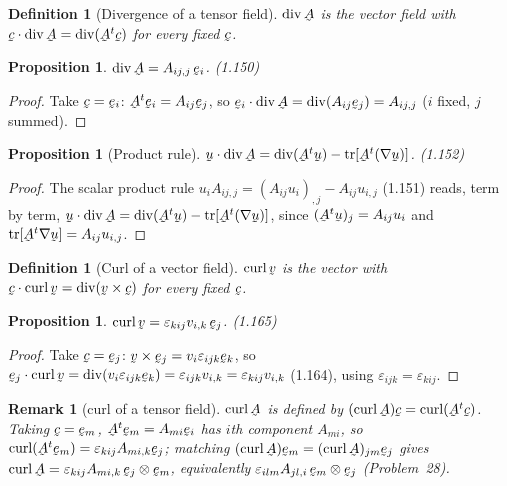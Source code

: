 \documentclass[17pt,a4paper]{extreport}
\DeclareRobustCommand{\vek}[1]{\underaccent{\tilde}{#1}}
\newcommand{\tr}{\operatorname{tr}}
\newcommand{\grad}{\nabla}
\newcommand{\dvg}{\operatorname{div}}
\newcommand{\crl}{\operatorname{curl}}
\newcommand{\bc}{\vek{c}}
\newcommand{\bu}{\vek{u}}
\newcommand{\bv}{\vek{v}}
\newcommand{\be}{\vek{e}}
\newcommand{\bA}{\vek{A}}
\newcommand{\eps}{\varepsilon}
\newcommand{\ip}[2]{#1\cdot#2}
\theoremstyle{scplain}
\newtheorem{proposition}[theorem]{Proposition}
\theoremstyle{scdefn}
\newtheorem{definition}[theorem]{Definition}
\newtheorem{remark}[theorem]{Remark}
\theoremstyle{scplain}
\begin{document}
\begin{definition}[Divergence of a tensor field]\label{def:divA}
$\dvg\bA$ is the vector field with $\ip\bc{\dvg\bA}=\dvg(\bA^{t}\bc)$ for
every fixed $\bc$.
\end{definition}

\begin{proposition}\label{prop:divA}
$\dvg\bA=A_{ij,j}\,\be_i$. \hfill\textup{(1.150)}
\end{proposition}

\begin{proof}
Take $\bc=\be_i$: $\bA^{t}\be_i=A_{ij}\be_j$, so
$\ip{\be_i}{\dvg\bA}=\dvg(A_{ij}\be_j)=A_{ij,j}$ ($i$ fixed, $j$ summed).
\end{proof}

\begin{proposition}[Product rule]\label{prop:divprod}
$\ip\bu{\dvg\bA}=\dvg(\bA^{t}\bu)-\tr[\bA^{t}(\grad\bu)]$. \hfill\textup{(1.152)}
\end{proposition}

\begin{proof}
The scalar product rule $u_iA_{ij,j}=(A_{ij}u_i)_{,j}-A_{ij}u_{i,j}$
(1.151) reads, term by term, $\ip\bu{\dvg\bA}=\dvg(\bA^{t}\bu)
-\tr[\bA^{t}(\grad\bu)]$, since $(\bA^{t}\bu)_j=A_{ij}u_i$ and
$\tr[\bA^{t}\grad\bu]=A_{ij}u_{i,j}$.
\end{proof}

\begin{definition}[Curl of a vector field]\label{def:curlv}
$\crl\bv$ is the vector with $\ip\bc{\crl\bv}=\dvg(\bv\times\bc)$ for every
fixed $\bc$.
\end{definition}

\begin{proposition}\label{prop:curlv}
$\crl\bv=\eps_{kij}v_{i,k}\,\be_j$. \hfill\textup{(1.165)}
\end{proposition}

\begin{proof}
Take $\bc=\be_j$: $\bv\times\be_j=v_i\eps_{ijk}\be_k$, so
$\ip{\be_j}{\crl\bv}=\dvg(v_i\eps_{ijk}\be_k)=\eps_{ijk}v_{i,k}
=\eps_{kij}v_{i,k}$ (1.164), using $\eps_{ijk}=\eps_{kij}$.
\end{proof}

\begin{remark}[curl of a tensor field]\label{rem:curlA}
$\crl\bA$ is defined by $(\crl\bA)\bc=\crl(\bA^{t}\bc)$. Taking
$\bc=\be_m$, $\bA^{t}\be_m=A_{mi}\be_i$ has $i$th component $A_{mi}$, so
$\crl(\bA^{t}\be_m)=\eps_{kij}A_{mi,k}\be_j$; matching
$(\crl\bA)\be_m=(\crl\bA)_{jm}\be_j$ gives
$\crl\bA=\eps_{kij}A_{mi,k}\,\be_j\otimes\be_m$, equivalently
$\eps_{ilm}A_{jl,i}\,\be_m\otimes\be_j$ (Problem~28).
\end{remark}
\end{document}
